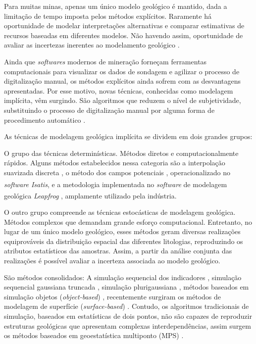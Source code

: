 Para muitas minas, apenas um único modelo geológico é mantido, dada a limitação de tempo imposta pelos métodos explícitos. Raramente há oportunidade de modelar interpretações alternativas e comparar estimativas de recursos baseadas em diferentes modelos. Não havendo assim, oportunidade de avaliar as incertezas inerentes ao modelamento geológico \cite{cowan2003practical}.

Ainda que \textit{softwares} modernos de mineração forneçam ferramentas computacionais para visualizar os dados de sondagem e agilizar o processo de digitalização manual, os métodos explícitos ainda sofrem com as desvantagens apresentadas. Por esse motivo, novas técnicas, conhecidas como modelagem implícita, vêm surgindo. São algoritmos que reduzem o nível de subjetividade, substituindo o processo de digitalização manual por alguma forma de procedimento automático \cite{maureira}.

As técnicas de modelagem geológica implícita se dividem em dois grandes grupos: 

O grupo das técnicas determinísticas. Métodos diretos e computacionalmente rápidos. Alguns métodos estabelecidos nessa categoria são a interpolação suavizada discreta \cite{mallet2002geomodeling}, o método dos campos potenciais \cite{chiles2004modelling,calcagno2008geological,renard2013modeling}, operacionalizado no \textit{software Isatis}\textsuperscript{\textregistered}, e a metodologia implementada no \textit{software} de modelagem geológica \textit{Leapfrog}\textsuperscript{\textregistered} \cite{cowan2002rapid,cowan2003practical}, amplamente utilizado pela indústria.

O outro grupo compreende as técnicas estocásticas de modelagem geológica. Métodos complexos que demandam grande esforço computacional. Entretanto, no lugar de um único modelo geológico, esses métodos geram diversas realizações equiprováveis da distribuição espacial das diferentes litologias, reproduzindo os atributos estatísticos das amostras. Assim, a partir da análise conjunta das realizações é possível avaliar a incerteza associada ao modelo geológico. 

São métodos consolidados: A simulação sequencial dos indicadores \cite{journel1983nonparametric}, simulação sequencial gaussiana truncada \cite{journel1984conditional}, simulação plurigaussiana \cite{galli1994pros}, métodos baseados em simulação objetos (\textit{object-based}) \cite{bridge1979simulation}, recentemente surgiram os métodos de modelagem de superfície (\textit{surface-based}) \cite{pyrcz2005stochastic}. Contudo, os algoritmos tradicionais de simulação, baseados em estatísticas de dois pontos, não são capazes de reproduzir estruturas geológicas que apresentam complexas interdependências, assim surgem os métodos baseados em geoestatística multiponto (MPS) \cite{guardiano1993multivariate}.

